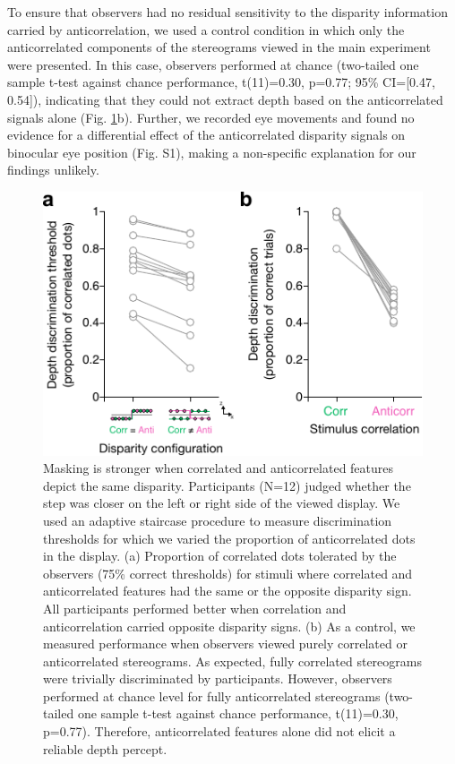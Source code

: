 To ensure that observers had no residual sensitivity to the disparity information carried by anticorrelation, we used a control condition in which only the anticorrelated components of the stereograms viewed in the main experiment were presented. In this case, observers performed at chance (two-tailed one sample t-test against chance performance, t(11)=0.30, p=0.77; 95\% CI=[0.47, 0.54]), indicating that they could not extract depth based on the anticorrelated signals alone (Fig. \ref{fig:c2f2}b). Further, we recorded eye movements and found no evidence for a differential effect of the anticorrelated disparity signals on binocular eye position (Fig. S1), making a non-specific explanation for our findings unlikely.

\begin{figure}
  \centering
  \includegraphics{Fig2}
  \caption[Masking is stronger when correlated and anticorrelated features depict the same disparity.]{Masking is stronger when correlated and anticorrelated features depict the same disparity. Participants (N=12) judged whether the step was closer on the left or right side of the viewed display. We used an adaptive staircase procedure to measure discrimination thresholds for which we varied the proportion of anticorrelated dots in the display. (a) Proportion of correlated dots tolerated by the observers (75\% correct thresholds) for stimuli where correlated and anticorrelated features had the same or the opposite disparity sign. All participants performed better when correlation and anticorrelation carried opposite disparity signs. (b) As a control, we measured performance when observers viewed purely correlated or anticorrelated stereograms. As expected, fully correlated stereograms were trivially discriminated by participants. However, observers performed at chance level for fully anticorrelated stereograms (two-tailed one sample t-test against chance performance, t(11)=0.30, p=0.77). Therefore, anticorrelated features alone did not elicit a reliable depth percept.}
  \label{fig:c2f2}
\end{figure}


